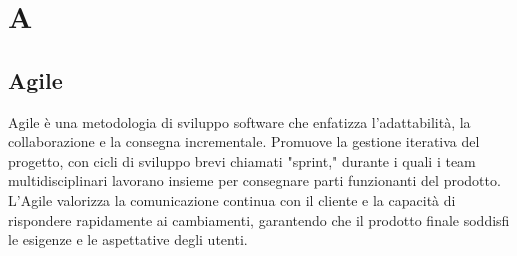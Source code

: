 \section{A}

\vspace{2em}
\subsection*{Agile}
Agile è una metodologia di sviluppo software che enfatizza l'adattabilità, la collaborazione e la consegna incrementale. Promuove la gestione iterativa del progetto, con cicli di sviluppo brevi chiamati "sprint," durante i quali i team multidisciplinari lavorano insieme per consegnare parti funzionanti del prodotto. L'Agile valorizza la comunicazione continua con il cliente e la capacità di rispondere rapidamente ai cambiamenti, garantendo che il prodotto finale soddisfi le esigenze e le aspettative degli utenti.